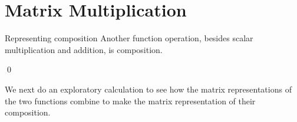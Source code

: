 \documentclass[10pt,t]{beamer}
\begin{document}
\section{Matrix Multiplication}
\begin{frame}{Representing composition}
Another function operation,
besides scalar multiplication and addition,   
is composition.

\pause
\lm[lm:CompositionOfLinearMapsIsLinear]

\pause
\pf
{}
\qed

\pause
\medskip
We next do an exploratory calculation to see how the matrix
representations of the two functions combine to make
the matrix representation of their composition.
\end{frame}
\end{document}

